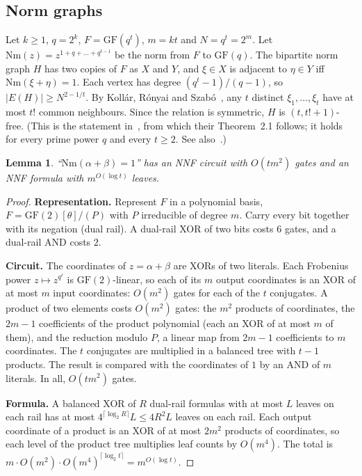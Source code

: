 \documentclass[11pt]{article}
\newtheorem{lemma}[theorem]{Lemma}
\theoremstyle{definition}
\theoremstyle{remark}
\newcommand{\GF}{\mathrm{GF}}
\newcommand{\Nm}{\mathrm{Nm}}
\begin{document}
\subsection{Norm graphs}

Let $k\ge 1$, $q=2^k$, $F=\GF(q^t)$, $m=kt$ and $N=q^t=2^m$. Let $\Nm(z)=z^{1+q+\dots+q^{t-1}}$ be the norm from $F$ to
$\GF(q)$. The bipartite norm graph $H$ has two copies of $F$ as $X$ and $Y$, and $\xi\in X$ is adjacent to $\eta\in Y$
iff $\Nm(\xi+\eta)=1$. Each vertex has degree $(q^t-1)/(q-1)$, so $|E(H)|\ge N^{2-1/t}$. By Koll\'ar, R\'onyai and
Szab\'o~\cite{KRS96}, any $t$ distinct $\xi_1,\dots,\xi_t$ have at most $t!$ common neighbours. Since the relation is
symmetric, $H$ is $(t,t!+1)$-free. (This is the statement in~\cite[Sect.~3]{KRS96}, from which their Theorem~2.1 follows; it holds for every prime
power $q$ and every $t\ge 2$. See also~\cite[Sect.~13.6]{BFC}.)

\begin{lemma}\label{lem:normcircuit}
``$\Nm(\alpha+\beta)=1$'' has an NNF circuit with $O(tm^2)$ gates and an NNF formula with $m^{O(\log t)}$ leaves.
\end{lemma}

\begin{proof}
\textbf{Representation.} Represent $F$ in a polynomial basis, $F=\GF(2)[\theta]/(P)$ with $P$ irreducible of degree
$m$. Carry every bit together with its negation (dual rail). A dual-rail XOR of two bits costs $6$
gates, and a dual-rail AND costs $2$.

\textbf{Circuit.} The coordinates of $z=\alpha+\beta$ are XORs of two literals. Each Frobenius power
$z\mapsto z^{q^\ell}$ is $\GF(2)$-linear, so each of its $m$ output coordinates is an XOR of at most $m$ input
coordinates: $O(m^2)$ gates for each of the $t$ conjugates. A product of two elements costs $O(m^2)$ gates: the $m^2$
products of coordinates, the $2m-1$ coefficients of the product polynomial (each an XOR of at most $m$ of them), and the
reduction modulo $P$, a linear map from $2m-1$ coefficients to $m$ coordinates. The $t$ conjugates are multiplied in a
balanced tree with $t-1$ products. The result is compared with the coordinates of $1$ by an AND of $m$ literals. In
all, $O(tm^2)$ gates.

\textbf{Formula.} A balanced XOR of $R$ dual-rail formulas with at most $L$ leaves on each rail has at most
$4^{\lceil\log_2 R\rceil}L\le 4R^2L$ leaves on each rail. Each output coordinate of a product is an XOR of at most
$2m^2$ products of coordinates, so each level of the product tree multiplies leaf counts by $O(m^4)$. The total is
$m\cdot O(m^2)\cdot O(m^4)^{\lceil\log_2 t\rceil}=m^{O(\log t)}$.
\end{proof}
\end{document}
